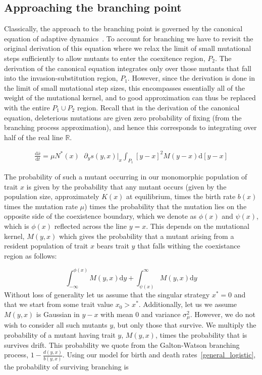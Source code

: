 \documentclass{article}
\newcommand{\ud}{\mathrm{d}}
\begin{document}
\subsection{Approaching the branching point}
Classically, the approach to the branching point is governed by the canonical equation of adaptive dynamics~\citep{dieckmann_jmb1996}.  To account for branching we have to revisit the original derivation of this equation where we relax the limit of small mutational steps sufficiently to allow mutants to enter the coexitence region, $P_2$.  The derivation of the canonical equation integrates only over those mutants that fall into the invasion-substitution region, $P_1$.  However, since the derivation is done in the limit of small mutational step sizes, this encompasses essentially all of the weight of the mutational kernel, and to good approximation can thus be replaced with the entire $P_1 \cup P_2$ region.  Recall that in the derivation of the canonical equation, deleterious mutations are given zero probability of fixing (from the branching process approximation), and hence this corresponds to integrating over half of the real line $\mathbb{R}$.  

\begin{align}
\frac{\ud \bar x}{\ud t} = \mu N^*(x) \phantom \cdot \partial_y s(y,x) \Big|_x \int_{P_1} [y-x]^2 M(y-x) \ud [y-x]
\label{canonical}
\end{align}

The probability of such a mutant occurring in our monomorphic population of trait $x$ is given by the probability that any mutant occurs (given by the population size, approximately $K(x)$ at equilibrium, times the birth rate $b(x)$ times the mutation rate $\mu$) times the probability that the mutation lies on the opposite side of the coexistence boundary, which we denote as $\phi(x)$ and $\psi(x)$, which is $\phi(x)$ reflected across the line $y=x$.  This depends on the mutational kernel, $M(y,x)$ which gives the probability that a mutant arising from a resident population of trait $x$ bears trait $y$ that falls withing the coexistance region as follows:

\begin{equation*}
\int_{-\infty}^{\phi(x)} M(y,x) \ud y + \int_{\psi(x)}^{\infty} M(y,x) \ud y 
\end{equation*}
Without loss of generality let us assume that the singular strategy $x^* = 0$ and that we start from some trait value $x_0 > x^*$.  Additionally, let us we assume $M(y,x)$ is Gaussian in $y-x$ with mean 0 and variance $\sigma_{\mu}^2$. However, we do not wish to consider all such mutants $y$, but only those that survive.  We multiply the probability of a mutant having trait $y$, $M(y,x)$, times the probability that is survives drift.  This probability we quote from the Galton-Watson branching process, $1-\tfrac{d(y,x)}{b(y,x)}$. Using our model for birth and death rates~\eqref{general_logistic}, the probability of surviving branching is
\end{document}
